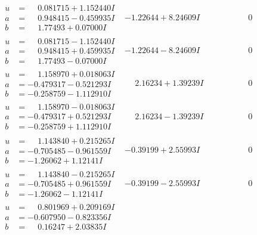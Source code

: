 \documentclass[1p]{elsarticle_modified}
\theoremstyle{definition}
\begin{document}
$$\begin{array}{c|c|c}
\begin{aligned}
u &= \phantom{-}0.081715 + 1.152440 I \\
a &= \phantom{-}0.948415 - 0.459935 I \\
b &= \phantom{-}1.77493 + 0.07000 I\end{aligned}
 & -1.22644 + 8.24609 I & \phantom{-0.000000 } 0 \\ \hline\begin{aligned}
u &= \phantom{-}0.081715 - 1.152440 I \\
a &= \phantom{-}0.948415 + 0.459935 I \\
b &= \phantom{-}1.77493 - 0.07000 I\end{aligned}
 & -1.22644 - 8.24609 I & \phantom{-0.000000 } 0 \\ \hline\begin{aligned}
u &= \phantom{-}1.158970 + 0.018063 I \\
a &= -0.479317 - 0.521293 I \\
b &= -0.258759 - 1.112910 I\end{aligned}
 & \phantom{-}2.16234 + 1.39239 I & \phantom{-0.000000 } 0 \\ \hline\begin{aligned}
u &= \phantom{-}1.158970 - 0.018063 I \\
a &= -0.479317 + 0.521293 I \\
b &= -0.258759 + 1.112910 I\end{aligned}
 & \phantom{-}2.16234 - 1.39239 I & \phantom{-0.000000 } 0 \\ \hline\begin{aligned}
u &= \phantom{-}1.143840 + 0.215265 I \\
a &= -0.705485 - 0.961559 I \\
b &= -1.26062 + 1.12141 I\end{aligned}
 & -0.39199 + 2.55993 I & \phantom{-0.000000 } 0 \\ \hline\begin{aligned}
u &= \phantom{-}1.143840 - 0.215265 I \\
a &= -0.705485 + 0.961559 I \\
b &= -1.26062 - 1.12141 I\end{aligned}
 & -0.39199 - 2.55993 I & \phantom{-0.000000 } 0 \\ \hline\begin{aligned}
u &= \phantom{-}0.801969 + 0.209169 I \\
a &= -0.607950 - 0.823356 I \\
b &= \phantom{-}0.16247 + 2.03835 I\end{aligned}

\end{array}$$
\end{document}
